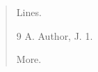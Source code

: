 \documentclass{article}
\begin{document}
\begin{verse}
Lines.
\begin{thebibliography}{9}
 A. Author, J. 1.
\end{thebibliography}
More.
\end{verse}
\end{document}
